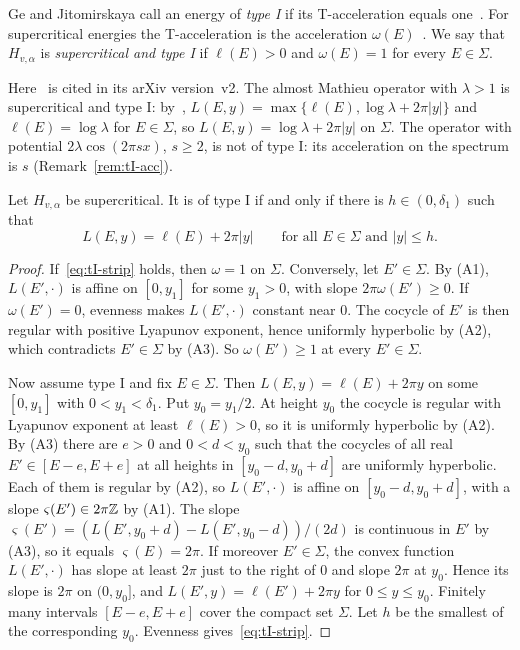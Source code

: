 \begin{definition}\label{def:tI}
Ge and Jitomirskaya call an energy of \emph{type I} if its T-acceleration equals one~\cite[Definition~2.1]{GeJitomirskaya2024}. For supercritical energies the T-acceleration is the acceleration $\omega(E)$~\cite[Section~2.1]{GeJitomirskaya2024}. We say that $H_{v,\alpha}$ is \emph{supercritical and type I} if $\ell(E)>0$ and $\omega(E)=1$ for every $E\in\Sigma$.
\end{definition}

Here~\cite{GeJitomirskaya2024} is cited in its arXiv version~v2. The almost Mathieu operator with $\lambda>1$ is supercritical and type I: by~\cite[Theorem~10 and Corollary~11]{Avila2015}, $L(E,y)=\max\{\ell(E),\log\lambda+2\pi|y|\}$ and $\ell(E)=\log\lambda$ for $E\in\Sigma$, so $L(E,y)=\log\lambda+2\pi|y|$ on $\Sigma$. The operator with potential $2\lambda\cos(2\pi sx)$, $s\ge2$, is not of type I: its acceleration on the spectrum is $s$ (Remark~\ref{rem:tI-acc}).

\begin{lemma}\label{lem:tI-T}
Let $H_{v,\alpha}$ be supercritical. It is of type I if and only if there is $h\in(0,\delta_1)$ such that
\begin{equation}\label{eq:tI-strip}
L(E,y)=\ell(E)+2\pi|y|\qquad\text{for all }E\in\Sigma\text{ and }|y|\le h.
\end{equation}
\end{lemma}

\begin{proof}
If~\eqref{eq:tI-strip} holds, then $\omega=1$ on $\Sigma$. Conversely, let $E'\in\Sigma$. By (A1), $L(E',\cdot)$ is affine on $[0,y_1]$ for some $y_1>0$, with slope $2\pi\omega(E')\ge0$. If $\omega(E')=0$, evenness makes $L(E',\cdot)$ constant near $0$. The cocycle of $E'$ is then regular with positive Lyapunov exponent, hence uniformly hyperbolic by (A2), which contradicts $E'\in\Sigma$ by (A3). So $\omega(E')\ge1$ at every $E'\in\Sigma$.

Now assume type I and fix $E\in\Sigma$. Then $L(E,y)=\ell(E)+2\pi y$ on some $[0,y_1]$ with $0<y_1<\delta_1$. Put $y_0=y_1/2$. At height $y_0$ the cocycle is regular with Lyapunov exponent at least $\ell(E)>0$, so it is uniformly hyperbolic by (A2). By (A3) there are $e>0$ and $0<d<y_0$ such that the cocycles of all real $E'\in[E-e,E+e]$ at all heights in $[y_0-d,y_0+d]$ are uniformly hyperbolic. Each of them is regular by (A2), so $L(E',\cdot)$ is affine on $[y_0-d,y_0+d]$, with a slope $\varsigma(E')\in2\pi\mathbb Z$ by (A1). The slope $\varsigma(E')=(L(E',y_0+d)-L(E',y_0-d))/(2d)$ is continuous in $E'$ by (A3), so it equals $\varsigma(E)=2\pi$. If moreover $E'\in\Sigma$, the convex function $L(E',\cdot)$ has slope at least $2\pi$ just to the right of $0$ and slope $2\pi$ at $y_0$. Hence its slope is $2\pi$ on $(0,y_0]$, and $L(E',y)=\ell(E')+2\pi y$ for $0\le y\le y_0$. Finitely many intervals $[E-e,E+e]$ cover the compact set $\Sigma$. Let $h$ be the smallest of the corresponding $y_0$. Evenness gives~\eqref{eq:tI-strip}.
\end{proof}

